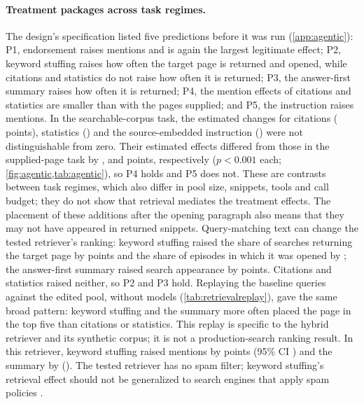 \paragraph{Treatment packages across task regimes.} The design's specification listed five predictions before it was
run (\cref{app:agentic}): P1, endorsement raises mentions and is again the largest legitimate effect; P2, keyword
stuffing raises how often the target page is returned and opened, while citations and statistics do not raise how
often it is returned; P3, the answer-first summary raises how often it is returned; P4, the mention effects of
citations and statistics are smaller than with the pages supplied; and P5, the instruction raises mentions. In the
searchable-corpus task, the estimated changes for citations
(\AgEMenCitations{} points), statistics (\AgEMenStatistics) and the source-embedded instruction
(\AgEMenInjection) were not distinguishable from zero. Their estimated effects differed from those in the supplied-page task by
\AgDiffMenCitationsU, \AgDiffMenStatisticsU{} and \AgDiffMenInjectionU{} points, respectively ($p < 0.001$ each;
\cref{fig:agentic,tab:agentic}), so P4 holds and P5 does not. These are contrasts between task regimes, which also differ in pool size, snippets,
tools and call budget; they do not show that retrieval mediates the treatment effects. The placement of these additions
after the opening paragraph also means that they may not have appeared in returned snippets. Query-matching text can
change the tested retriever's ranking: keyword stuffing raised the share of searches returning the target page by
\AgESurfKeywordStuffingU{} points and the share of episodes in which it was opened by \AgEOpenKeywordStuffingU;
the answer-first summary raised search appearance by \AgESurfAnswerFirstU{} points. Citations and statistics raised
neither, so P2 and P3 hold. Replaying the baseline queries against the edited pool, without models (\cref{tab:retrievalreplay}), gave the same broad pattern:
keyword stuffing and the summary more often placed the page in the top five than citations or statistics. This replay
is specific to the hybrid retriever and its synthetic corpus; it is not a production-search ranking result. In this
retriever, keyword stuffing raised mentions by \AgEMenKeywordStuffing{} points (95\% CI \AgEMenKeywordStuffingCI)
and the summary by \AgEMenAnswerFirst{} (\AgEMenAnswerFirstCI). The tested retriever has no spam filter; keyword
stuffing's retrieval effect should not be generalized to search engines that apply spam policies
\citep{google2026spam}.


